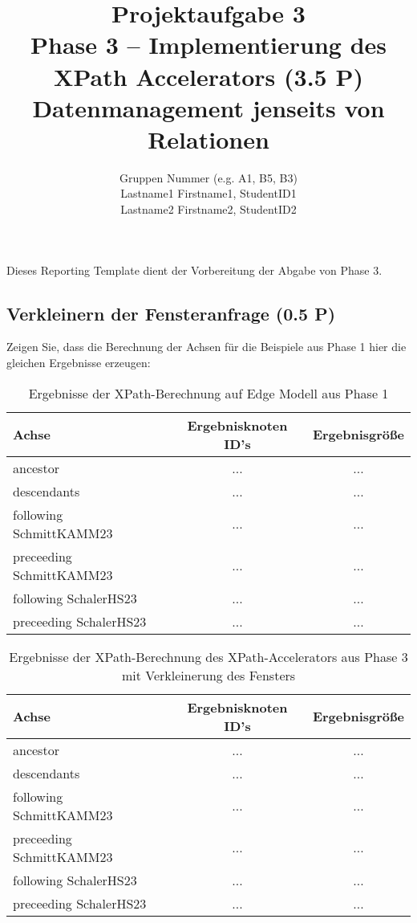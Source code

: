 \documentclass[11pt]{scrartcl}
\title{
  \textbf{\large Projektaufgabe 3 } \\
  Phase 3 – Implementierung des XPath Accelerators (3.5 P) \\
  {\large Datenmanagement jenseits von Relationen}
}
\author{
  Gruppen Nummer (e.g. A1, B5, B3) \\
  \large Lastname1 Firstname1, StudentID1 \\
  \large Lastname2 Firstname2, StudentID2 
}
\begin{document}
\maketitle\thispagestyle{empty}

Dieses Reporting Template dient der Vorbereitung der Abgabe von Phase 3. 

\subsection*{Verkleinern der Fensteranfrage (0.5 P)}

Zeigen Sie, dass die Berechnung der Achsen für die Beispiele aus Phase 1 hier die gleichen Ergebnisse erzeugen:

\begin{table}[h]
	\centering
		\begin{center}
			\begin{tabular}{ l | c c }
				\toprule
				Achse & Ergebnisknoten ID's & Ergebnisgröße\\
				\midrule
				ancestor & ... & ... \\ 
				descendants & ... & ... \\  
				following SchmittKAMM23& ... & ... \\  
				preceeding SchmittKAMM23 & ... & ... \\ 
				following SchalerHS23& ... & ... \\  
				preceeding SchalerHS23& ... & ... \\ 
				\bottomrule
			\end{tabular}
			\end{center}
	\caption{Ergebnisse der XPath-Berechnung auf Edge Modell aus Phase 1}
	\label{tab:ErgebnisseDerXPathBerechnug1}
\end{table}

\begin{table}[h]
	\centering
		\begin{center}
			\begin{tabular}{ l | c c }
				\toprule
				Achse & Ergebnisknoten ID's & Ergebnisgröße\\
				\midrule
				ancestor & ... & ... \\ 
				descendants & ... & ... \\  
				following SchmittKAMM23& ... & ... \\  
				preceeding SchmittKAMM23 & ... & ... \\ 
				following SchalerHS23& ... & ... \\  
				preceeding SchalerHS23& ... & ... \\ 
				\bottomrule
			\end{tabular}
			\end{center}
	\caption{Ergebnisse der XPath-Berechnung des XPath-Accelerators aus Phase 3 mit Verkleinerung des Fensters}
	\label{tab:ErgebnisseDerXPathBerechnug2}
\end{table}
\end{document}

